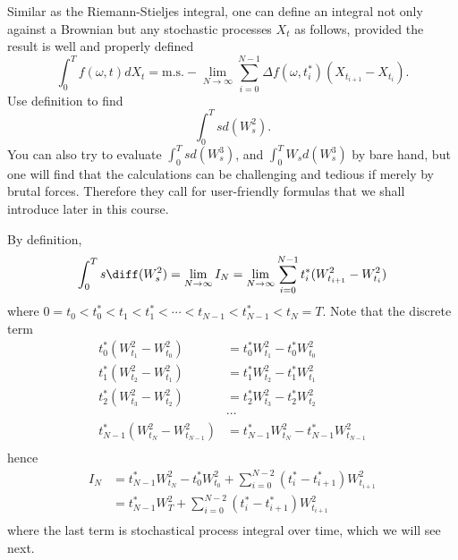     \problem
    \begin{question}
        Similar as the Riemann-Stieljes integral, one can define an integral not only against
        a Brownian but any stochastic processes $X_t$ as follows, provided the result is well
        and properly defined
        \[\int_0^T f(\omega,t)dX_t=\text{m.s.}-\lim_{N\rightarrow\infty}\sum^{N-1}_{i=0}
        \Delta f(\omega,t^*_i)(X_{t_{i+1}}-X_{t_{i}}).\]
        Use definition to find 
        \[\int_0^T s d(W^2_s).\]
        You can also try to evaluate $\int_0^T s d(W^3_s)$, and $\int_0^T W_s d(W^3_s)$
        by bare hand, but one will find that the calculations can be challenging and tedious
        if merely by brutal forces.  Therefore they call for user-friendly formulas that we
        shall introduce later in this course.
    \end{question}
    By definition,
    \[\int_0^Ts\diff(W_s^2)
    =\lim_{N\to\infty}I_N
    =\lim_{N\to\infty}\sum_{i=0}^{N-1}t_i^*(W_{t_{i+1}}^2-W_{t_i}^2)\]
    where
    $0=t_0<t_0^*<t_1<t_1^*<\cdots<t_{N-1}<t_{N-1}^*<t_N=T$.
    Note that the discrete term
    \[\begin{aligned}
        t_0^*(W_{t_1}^2-W_{t_0}^2)&=t_0^*W_{t_1}^2-t_0^*W_{t_0}^2\\
        t_1^*(W_{t_2}^2-W_{t_1}^2)&=t_1^*W_{t_2}^2-t_1^*W_{t_1}^2\\
        t_2^*(W_{t_3}^2-W_{t_2}^2)&=t_2^*W_{t_3}^2-t_2^*W_{t_2}^2\\
        &\cdots\\
        t_{N-1}^*(W_{t_N}^2-W_{t_{N-1}}^2)&=t_{N-1}^*W_{t_N}^2-t_{N-1}^*W_{t_{N-1}}^2\\
    \end{aligned}\]
    hence
    \[\begin{aligned}
        I_N
        &=t_{N-1}^*W_{t_N}^2-t_0^*W_{t_0}^2
          +\sum_{i=0}^{N-2}(t_i^*-t_{i+1}^*)W_{t_{i+1}}^2\\
        &=t^*_{N-1}W_T^2
          +\sum_{i=0}^{N-2}(t_i^*-t_{i+1}^*)W_{t_{i+1}}^2\\
    \end{aligned}\]
    where the last term is stochastical process integral
    over time, which we will see next.

